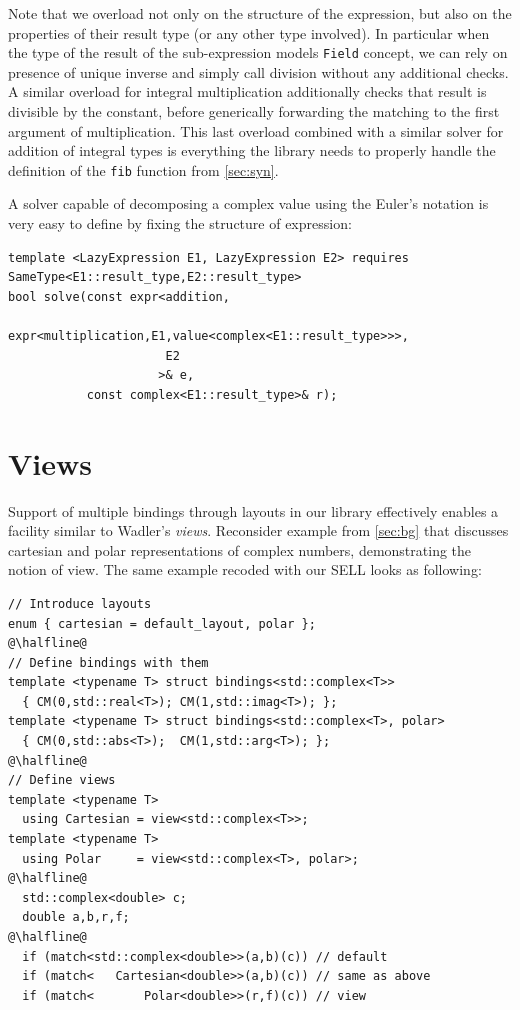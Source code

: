 \documentclass[preprint]{sigplanconf}
\makeatletter
\DeclareRobustCommand{\code}[1]{{\lstinline[breaklines=false,escapechar=@]{#1}}}
\makeatother
\begin{document}
\noindent
Note that we overload not only on the structure of the expression, but also on 
the properties of their result type (or any other type involved). In particular 
when the type of the result of the sub-expression models \code{Field} concept, 
we can rely on presence of unique inverse and simply call division without any 
additional checks. A similar overload for integral multiplication additionally 
checks that result is divisible by the constant, before generically forwarding 
the matching to the first argument of multiplication. This last overload 
combined with a similar solver for addition of integral types is everything the 
library needs to properly handle the definition of the \code{fib} function from 
\textsection\ref{sec:syn}.

A solver capable of decomposing a complex value using the Euler's notation is 
very easy to define by fixing the structure of expression:

\begin{lstlisting}
template <LazyExpression E1, LazyExpression E2> requires SameType<E1::result_type,E2::result_type>
bool solve(const expr<addition,
                      expr<multiplication,E1,value<complex<E1::result_type>>>,
                      E2
                     >& e, 
           const complex<E1::result_type>& r);
\end{lstlisting}

\section{Views}
\label{sec:view}

Support of multiple bindings through layouts in our library effectively enables 
a facility similar to Wadler's \emph{views}. Reconsider example from 
\textsection\ref{sec:bg} that discusses cartesian and polar representations of 
complex numbers, demonstrating the notion of view. The same example recoded with 
our SELL looks as following:

\begin{lstlisting}[keepspaces,columns=flexible]
// Introduce layouts
enum { cartesian = default_layout, polar };
@\halfline@
// Define bindings with them
template <typename T> struct bindings<std::complex<T>>
  { CM(0,std::real<T>); CM(1,std::imag<T>); };
template <typename T> struct bindings<std::complex<T>, polar>
  { CM(0,std::abs<T>);  CM(1,std::arg<T>); };
@\halfline@
// Define views
template <typename T> 
  using Cartesian = view<std::complex<T>>;
template <typename T> 
  using Polar     = view<std::complex<T>, polar>;
@\halfline@
  std::complex<double> c;
  double a,b,r,f;
@\halfline@
  if (match<std::complex<double>>(a,b)(c)) // default
  if (match<   Cartesian<double>>(a,b)(c)) // same as above
  if (match<       Polar<double>>(r,f)(c)) // view
\end{lstlisting}
\end{document}
